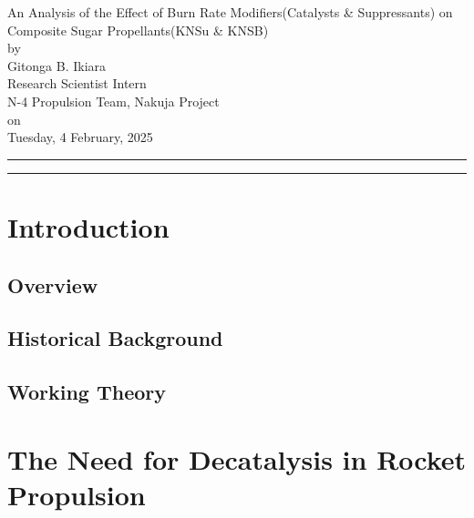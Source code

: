 \documentclass[12pt,letterpaper]{article}
\begin{document}
    \begin{center}
        \huge{An Analysis of the Effect of Burn Rate Modifiers(Catalysts \& Suppressants) on Composite Sugar Propellants(KNSu \& KNSB)} \\
        by 																\\
        \Large{Gitonga B. Ikiara} 													\\
        \large{Research Scientist Intern} 												\\
        \large{N-4 Propulsion Team, Nakuja Project} 											\\
        on 																\\
        \large{Tuesday, 4 February, 2025}
    \end{center}

    \rule{\textwidth}{0.5pt}
    \begin{abstract}
        \noindent\lipsum[1-1]
    \end{abstract}
    \rule{\textwidth}{0.5pt}

    \section{Introduction}
        \subsection{Overview}
                \lipsum[1-2]
            \subsection{Historical Background}
                    \lipsum[1-3]
        \subsection{Working Theory}
            \lipsum[1-2]\cite{Nakka:2001}

    \section{The Need for Decatalysis in Rocket Propulsion}
\end{document}
